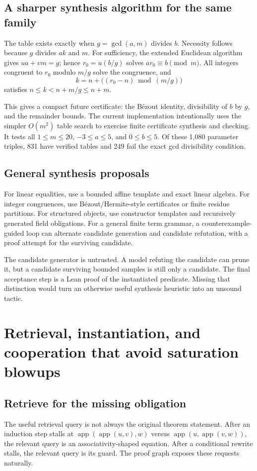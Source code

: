 \documentclass[11pt,letterpaper]{article}
\theoremstyle{definition}\newtheorem{definition}[theorem]{Definition}
\theoremstyle{remark}\newtheorem{remark}[theorem]{Remark}
\begin{document}
\subsection{A sharper synthesis algorithm for the same family}
The table exists exactly when $g=\gcd(a,m)$ divides $b$. Necessity follows because $g$ divides $ak$ and $m$. For sufficiency, the extended Euclidean algorithm gives $ua+vm=g$; hence $r_0=u(b/g)$ solves $ar_0\equiv b\pmod m$. All integers congruent to $r_0$ modulo $m/g$ solve the congruence, and
\[
 k=n+\bigl((r_0-n)\bmod (m/g)\bigr)
\]
satisfies $n\le k<n+m/g\le n+m$.

This gives a compact future certificate: the B\'ezout identity, divisibility of $b$ by $g$, and the remainder bounds. The current implementation intentionally uses the simpler $O(m^2)$ table search to exercise finite certificate synthesis and checking. It tests all $1\le m\le20$, $-3\le a\le5$, and $0\le b\le5$. Of these 1,080 parameter triples, 831 have verified tables and 249 fail the exact gcd divisibility condition.

\subsection{General synthesis proposals}
For linear equalities, use a bounded affine template and exact linear algebra. For integer congruences, use B\'ezout/Hermite-style certificates or finite residue partitions. For structured objects, use constructor templates and recursively generated field obligations. For a general finite term grammar, a counterexample-guided loop can alternate candidate generation and candidate refutation, with a proof attempt for the surviving candidate.

The candidate generator is untrusted. A model refuting the candidate can prune it, but a candidate surviving bounded samples is still only a candidate. The final acceptance step is a Lean proof of the instantiated predicate. Missing that distinction would turn an otherwise useful synthesis heuristic into an unsound tactic.

\section{Retrieval, instantiation, and cooperation that avoid saturation blowups}
\subsection{Retrieve for the missing obligation}
The useful retrieval query is not always the original theorem statement. After an induction step stalls at
$\operatorname{app}(\operatorname{app}(u,v),w)$ versus
$\operatorname{app}(u,\operatorname{app}(v,w))$, the relevant query is an associativity-shaped equation. After a conditional rewrite stalls, the relevant query is its guard. The proof graph exposes these requests naturally.
\end{document}
